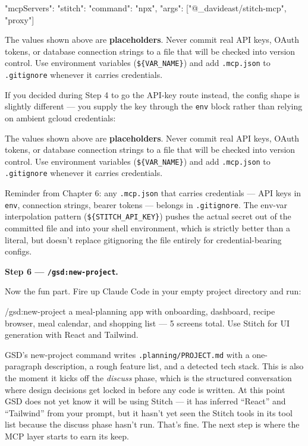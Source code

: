 \documentclass[11pt,letterpaper,openany]{book}
\newcommand{\credentialwarning}{%
\begin{gsdwarning}[Credential Safety]
The values shown above are \textbf{placeholders}. Never commit real API keys,
OAuth tokens, or database connection strings to a file that will be checked
into version control. Use environment variables (\texttt{\$\{VAR\_NAME\}}) and
add \texttt{.mcp.json} to \texttt{.gitignore} whenever it carries credentials.
\end{gsdwarning}%
}
\begin{document}
\begin{gsdscenario}
\begin{gsdjson}
{
  "mcpServers": {
    "stitch": {
      "command": "npx",
      "args": ["@_davideast/stitch-mcp", "proxy"]
    }
  }
}
\end{gsdjson}

\credentialwarning

If you decided during Step 4 to go the API-key route instead, the
config shape is slightly different --- you supply the key through the
\texttt{env} block rather than relying on ambient gcloud credentials:


\credentialwarning

Reminder from Chapter 6: any \texttt{.mcp.json} that carries
credentials --- API keys in \texttt{env}, connection strings, bearer
tokens --- belongs in \texttt{.gitignore}. The env-var interpolation
pattern (\texttt{\$\{STITCH\_API\_KEY\}}) pushes the actual secret out
of the committed file and into your shell environment, which is
strictly better than a literal, but doesn't replace gitignoring the
file entirely for credential-bearing configs.

\vspace{6pt}
\textbf{Step 6 --- \texttt{/gsd:new-project}.}
\vspace{4pt}

Now the fun part. Fire up Claude Code in your empty project directory
and run:

\begin{gsdbash}
/gsd:new-project a meal-planning app with onboarding, dashboard,
  recipe browser, meal calendar, and shopping list --- 5 screens
  total. Use Stitch for UI generation with React and Tailwind.
\end{gsdbash}

GSD's new-project command writes \texttt{.planning/PROJECT.md} with a
one-paragraph description, a rough feature list, and a detected tech
stack. This is also the moment it kicks off the \emph{discuss} phase,
which is the structured conversation where design decisions get
locked in before any code is written. At this point GSD does not yet
know it will be using Stitch --- it has inferred ``React'' and
``Tailwind'' from your prompt, but it hasn't yet seen the Stitch tools
in its tool list because the discuss phase hasn't run. That's fine.
The next step is where the MCP layer starts to earn its keep.


\end{gsdscenario}
\end{document}
